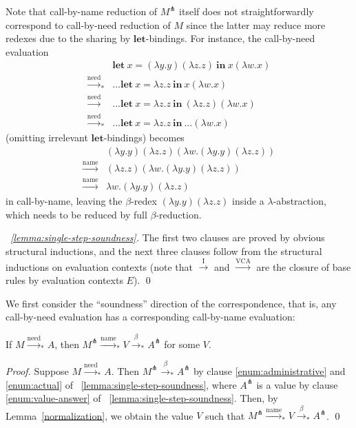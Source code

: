 \documentclass{llncs}
\newcommand{\LET}[3]{\mathbf{let}~#1=#2~\mathbf{in}~#3}
\newcommand{\EXPANDLET}[1]{#1^\pitchfork}
\newcommand{\FULLBETA}{\xrightarrow{\beta}}
\newcommand{\CALLBYNAME}{\xrightarrow{\mathrm{name}}}
\newcommand{\CALLBYNEED}{\xrightarrow{\mathrm{need}}}
\newcommand{\CALLBYNEEDI}{\xrightarrow{\mathrm{I}}}
\newcommand{\CALLBYNEEDVCA}{\xrightarrow{\mathrm{VCA}}}
\newcommand{\RTCLOS}[1]{#1_*}
\begin{document}
Note that call-by-name reduction of $\EXPANDLET{M}$ itself does not straightforwardly correspond to call-by-need reduction of $M$ since the latter may reduce more redexes due to the sharing by $\mathbf{let}$-bindings.  For instance, the call-by-need evaluation
\[\begin{array}{ll}
	& \LET{x}{(\lambda y.y)(\lambda z.z)}{x(\lambda w.x)}\\
	\RTCLOS{\CALLBYNEED} & \dots\LET{x}{\lambda z.z}{x(\lambda w.x)} \\
	\CALLBYNEED & \dots\LET{x}{\lambda z.z}{(\lambda z.z)(\lambda w.x)} \\
	\RTCLOS{\CALLBYNEED} & \dots\LET{x}{\lambda z.z}{\dots(\lambda w.x)}
\end{array}\]
(omitting irrelevant $\mathbf{let}$-bindings) becomes
\[\begin{array}{ll}
	& (\lambda y.y)(\lambda z.z)(\lambda w.(\lambda y.y)(\lambda z.z)) \\
	\CALLBYNAME & (\lambda z.z)(\lambda w.(\lambda y.y)(\lambda z.z)) \\
	\CALLBYNAME & \lambda w. (\lambda y.y)(\lambda z.z)
\end{array} \]
in call-by-name, leaving the $\beta$-redex $(\lambda y.y)(\lambda z.z)$ inside a $\lambda$-abstraction, which needs to be reduced by full $\beta$-reduction.

%
\begin{proof}[\lemmaname~\ref{lemma:single-step-soundness}]
	The first two clauses are proved by obvious structural inductions,
	and the next three clauses follow from the structural inductions on evaluation contexts
	(note that $\CALLBYNEEDI$ and $\CALLBYNEEDVCA$ are the closure of base rules by evaluation contexts $E$). \qed
\end{proof}

We first consider the ``soundness'' direction of the correspondence, that is, any call-by-need evaluation has a corresponding call-by-name evaluation:
\begin{theorem}[soundness]\label{theorem:soundness}
	If $M \RTCLOS{\CALLBYNEED} A$, then $\EXPANDLET{M} \RTCLOS{\CALLBYNAME} V \RTCLOS{\FULLBETA} \EXPANDLET{A}$ for some $V$.
\end{theorem}

\begin{proof}
	Suppose $M \RTCLOS{\CALLBYNEED} A$.  Then $\EXPANDLET{M} \RTCLOS{\FULLBETA} \EXPANDLET{A}$ by clause \ref{enum:administrative} and \ref{enum:actual} of \lemmaname~\ref{lemma:single-step-soundness}, where $\EXPANDLET{A}$ is a value by clause \ref{enum:value-answer} of \lemmaname~\ref{lemma:single-step-soundness}.
	Then, by Lemma~\ref{normalization}, we obtain the value $V$ such that $\EXPANDLET{M} \RTCLOS{\CALLBYNAME} V \RTCLOS{\FULLBETA} \EXPANDLET{A}$. \qed
\end{proof}
\end{document}
